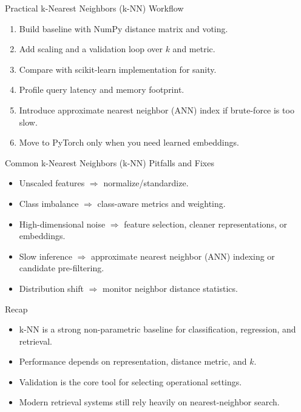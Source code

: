 \begin{frame}{Practical k-Nearest Neighbors (k-NN) Workflow}
\begin{enumerate}
  \item Build baseline with NumPy distance matrix and voting.
  \pause
  \item Add scaling and a validation loop over $k$ and metric.
  \pause
  \item Compare with scikit-learn implementation for sanity.
  \pause
  \item Profile query latency and memory footprint.
  \pause
  \item Introduce approximate nearest neighbor (ANN) index if brute-force is too slow.
  \pause
  \item Move to PyTorch only when you need learned embeddings.
\end{enumerate}
\end{frame}

\begin{frame}{Common k-Nearest Neighbors (k-NN) Pitfalls and Fixes}
\begin{itemize}
  \item Unscaled features $\Rightarrow$ normalize/standardize.
  \pause
  \item Class imbalance $\Rightarrow$ class-aware metrics and weighting.
  \pause
  \item High-dimensional noise $\Rightarrow$ feature selection, cleaner representations, or embeddings.
  \pause
  \item Slow inference $\Rightarrow$ approximate nearest neighbor (ANN) indexing or candidate pre-filtering.
  \pause
  \item Distribution shift $\Rightarrow$ monitor neighbor distance statistics.
\end{itemize}
\end{frame}

\begin{frame}{Recap}
\begin{itemize}
  \item k-NN is a strong non-parametric baseline for classification, regression, and retrieval.
  \pause
  \item Performance depends on representation, distance metric, and $k$.
  \pause
  \item Validation is the core tool for selecting operational settings.
  \pause
  \item Modern retrieval systems still rely heavily on nearest-neighbor search.
\end{itemize}
\end{frame}

